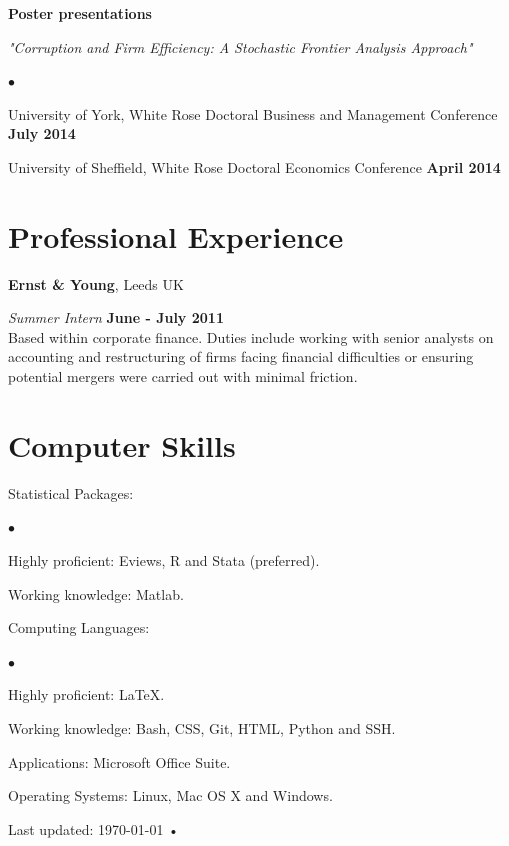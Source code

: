 \documentclass[margin,line,9pt]{res}
\newenvironment{list1}{
  \begin{list}{\ding{113}}{%
      \setlength{\itemsep}{0in}
      \setlength{\parsep}{0in} \setlength{\parskip}{0in}
      \setlength{\topsep}{0in} \setlength{\partopsep}{0in} 
      \setlength{\leftmargin}{0.17in}}}{\end{list}}
\newenvironment{list2}{
  \begin{list}{$\bullet$}{%
      \setlength{\itemsep}{0in}
      \setlength{\parsep}{0in} \setlength{\parskip}{0in}
      \setlength{\topsep}{0in} \setlength{\partopsep}{0in} 
      \setlength{\leftmargin}{0.2in}}}{\end{list}}
\begin{document}
\begin{resume}
\textbf{Poster presentations}
\vspace*{.05in} 
\begin{list1}
\item[] \textit{"Corruption and Firm Efficiency: A Stochastic Frontier Analysis Approach"}
\vspace*{.1in} 
\begin{list2}
\item University of York, White Rose Doctoral Business and Management Conference \hfill \textbf{July 2014}
\item University of Sheffield, White Rose Doctoral Economics Conference \hfill \textbf{April 2014}
\end{list2}
\end{list1}


\section{\sc Professional Experience}
{\bf Ernst \& Young}, Leeds UK

\vspace{-.3cm}
{\em Summer Intern} \hfill {\bf June - July 2011}\\
Based within corporate finance. Duties include working with senior analysts on accounting and restructuring of firms facing financial difficulties or ensuring potential mergers were carried out with minimal friction.

\section{\sc Computer Skills} 
\begin{list1}
\item[] Statistical Packages:
	\begin{list2}
		\item Highly proficient: Eviews, R and Stata (preferred).	
		\item Working knowledge: Matlab.
	\end{list2}
	\smallskip
\item[] Computing Languages:
	\begin{list2}
		\item Highly proficient: \LaTeX.	
		\item Working knowledge: Bash, CSS, Git, HTML, Python and SSH.
	\end{list2}
	\smallskip
\item[] Applications: Microsoft Office Suite.
	\smallskip
\item[] Operating Systems:  Linux, Mac OS X and Windows.\\ 
\end{list1}

\begin{center}
{Last updated: \today\- •\- }
\end{center}

\end{resume}
\end{document}
